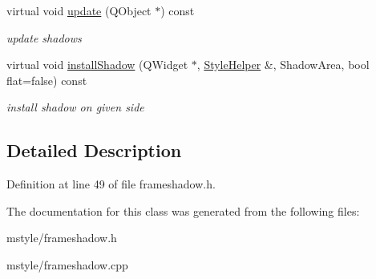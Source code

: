 \begin{DoxyCompactItemize}
virtual void \hyperlink{class_frame_shadow_factory_a50b91e17df9a7b482f874363049a7da8}{update} (Q\+Object $\ast$) const
\begin{DoxyCompactList}\small\item\em update shadows \end{DoxyCompactList}\item 
\mbox{\label{class_frame_shadow_factory_acb796400fffa366b91d1a07ca5f798cb}} 
virtual void \hyperlink{class_frame_shadow_factory_acb796400fffa366b91d1a07ca5f798cb}{install\+Shadow} (Q\+Widget $\ast$, \hyperlink{class_style_helper}{Style\+Helper} \&, Shadow\+Area, bool flat=false) const
\begin{DoxyCompactList}\small\item\em install shadow on given side \end{DoxyCompactList}\end{DoxyCompactItemize}


\subsection{Detailed Description}


Definition at line 49 of file frameshadow.\+h.



The documentation for this class was generated from the following files\+:\begin{DoxyCompactItemize}
\item 
mstyle/frameshadow.\+h\item 
mstyle/frameshadow.\+cpp\end{DoxyCompactItemize}
